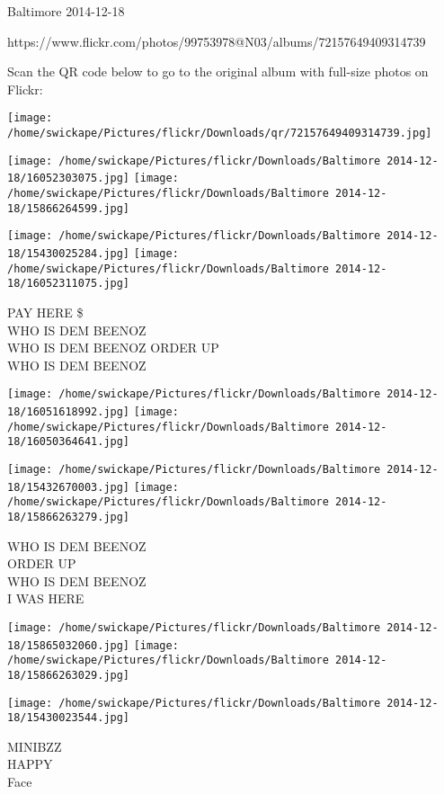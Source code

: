 \documentclass[10pt,letterpaper]{article}
\begin{document}
Baltimore 2014-12-18

https://www.flickr.com/photos/99753978@N03/albums/72157649409314739

Scan the QR code below to go to the original album with full-size photos on Flickr:

\texttt{[image: /home/swickape/Pictures/flickr/Downloads/qr/72157649409314739.jpg]}
\pagebreak

\texttt{[image: /home/swickape/Pictures/flickr/Downloads/Baltimore 2014-12-18/16052303075.jpg]}
\texttt{[image: /home/swickape/Pictures/flickr/Downloads/Baltimore 2014-12-18/15866264599.jpg]}

\texttt{[image: /home/swickape/Pictures/flickr/Downloads/Baltimore 2014-12-18/15430025284.jpg]}
\texttt{[image: /home/swickape/Pictures/flickr/Downloads/Baltimore 2014-12-18/16052311075.jpg]}

PAY HERE \$\\
WHO IS DEM BEENOZ\\
WHO IS DEM BEENOZ ORDER UP\\
WHO IS DEM BEENOZ\\
\pagebreak

\texttt{[image: /home/swickape/Pictures/flickr/Downloads/Baltimore 2014-12-18/16051618992.jpg]}
\texttt{[image: /home/swickape/Pictures/flickr/Downloads/Baltimore 2014-12-18/16050364641.jpg]}

\texttt{[image: /home/swickape/Pictures/flickr/Downloads/Baltimore 2014-12-18/15432670003.jpg]}
\texttt{[image: /home/swickape/Pictures/flickr/Downloads/Baltimore 2014-12-18/15866263279.jpg]}

WHO IS DEM BEENOZ\\
ORDER UP\\
WHO IS DEM BEENOZ\\
I WAS HERE\\
\pagebreak

\texttt{[image: /home/swickape/Pictures/flickr/Downloads/Baltimore 2014-12-18/15865032060.jpg]}
\texttt{[image: /home/swickape/Pictures/flickr/Downloads/Baltimore 2014-12-18/15866263029.jpg]}

\vspace{0.25in}
\texttt{[image: /home/swickape/Pictures/flickr/Downloads/Baltimore 2014-12-18/15430023544.jpg]}

MINIBZZ\\
HAPPY\\
Face\\
\pagebreak
\end{document}

